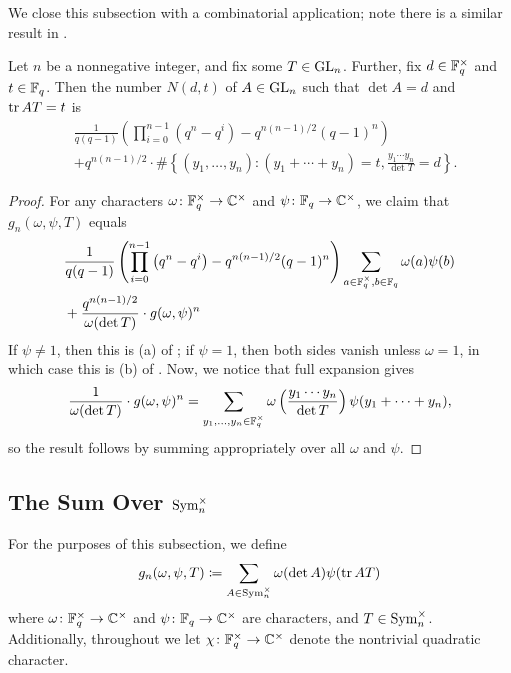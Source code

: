 We close this subsection with a combinatorial application; note there is a similar result in \cite[Theorem~6.2]{kim-gauss-sum}.
\begin{corollary}
    Let $n$ be a nonnegative integer, and fix some $T\in\mathrm{GL}_n$. Further, fix $d\in\mathbb F_q^\times$ and $t\in\mathbb F_q$. Then the number $N(d,t)$ of $A\in\mathrm{GL}_n$ such that $\det A=d$ and $\operatorname{tr} AT=t$ is
    \begin{align*}
        &\frac1{q(q-1)}\left(\prod_{i=0}^{n-1}\left(q^n-q^i\right)-q^{n(n-1)/2}(q-1)^n\right) \\
        &+q^{n(n-1)/2}\cdot\#\left\{(y_1,\ldots,y_n):(y_1+\cdots+y_n)=t,\frac{y_1\cdots y_n}{\det T}=d\right\}.
    \end{align*}
\end{corollary}
\begin{proof}
    For any characters $\omega\colon\mathbb F_q^\times\to\mathbb C^\times$ and $\psi\colon\mathbb F_q\to\mathbb C^\times$, we claim that $g_n(\omega,\psi,T)$ equals
    \begin{align*}
        &\frac1{q(q-1)}\left(\prod_{i=0}^{n-1}\left(q^n-q^i\right)-q^{n(n-1)/2}(q-1)^n\right)\sum_{a\in\mathbb F_q^\times,b\in\mathbb F_q}\omega(a)\psi(b) \\
        &+ \frac{q^{n(n-1)/2}}{\omega(\det T)}\cdot g(\omega,\psi)^n
    \end{align*}
    If $\psi\ne1$, then this is (a) of ; if $\psi=1$, then both sides vanish unless $\omega=1$, in which case this is (b) of . Now, we notice that full expansion gives
    \[\frac1{\omega(\det T)}\cdot g(\omega,\psi)^n=\sum_{y_1,\ldots,y_n\in\mathbb F_q^\times}\omega\left(\frac{y_1\cdots y_n}{\det T}\right)\psi(y_1+\cdots+y_n),\]
    so the result follows by summing appropriately over all $\omega$ and $\psi$.
\end{proof}

\subsection{The Sum Over \texorpdfstring{$\operatorname{Sym}_n^\times$}{ Sym}}
For the purposes of this subsection, we define
\[g_n(\omega,\psi,T)\coloneqq\sum_{A\in\operatorname{Sym}_n^\times}\omega(\det A)\psi(\operatorname{tr} AT)\]
where $\omega\colon\mathbb F_q^\times\to\mathbb C^\times$ and $\psi\colon\mathbb F_q\to\mathbb C^\times$ are characters, and $T\in\operatorname{Sym}_n^\times$. Additionally, throughout we let $\chi\colon\mathbb F_q^\times\to\mathbb C^\times$ denote the nontrivial quadratic character.

